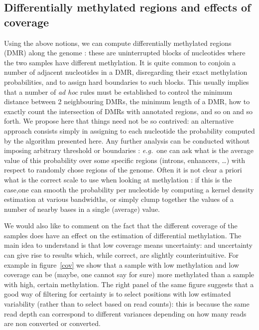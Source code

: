 \documentclass[11pt]{amsart}
\newcommand{\eg}{\textit{e.g.}\ }
\begin{document}
\subsection{Differentially methylated regions and effects of coverage}
Using the above notions, we can compute differentially methylated regions (DMR) along the genome : these are uninterrupted blocks of nucleotides where the two samples have different methylation.
It is quite common to conjoin a number of adjacent nucleotides in a DMR, disregarding their exact methylation probabilities, and to assign hard boundaries to such blocks. This usually implies that a number of \textit{ad hoc} rules must be established to control the minimum distance between 2 neighbouring DMRs, the minimum length of a DMR, how to exactly count the intersection of DMRs with annotated regions, and so on and so forth. We propose here that things need not be so contrived: an alternative approach consists simply in assigning to each nucleotide the probability computed by the algorithm presented here. Any further analysis can be conducted without imposing arbitrary threshold or boundaries : \eg one can ask what is the average value of this probability over some specific regions (introns, enhancers, \dots) with respect to randomly chose regions of the genome. Often it is not clear a priori what is the correct scale to use when looking at methylation : if this is the case,one can smooth the probability per nucleotide by computing a kernel density estimation at various bandwidths, or simply clump together the values of a number of nearby bases in a single (average) value. 

We would also like to comment on the fact that the different coverage of the samples does have an effect on
the estimation of differential methylation. The main idea to understand is that low coverage means uncertainty: and uncertainty can give rise to results which, while correct, are slightly counterintuitive. For example in figure~\ref{cov} we show that a sample with low methylation and low coverage can be (maybe, one cannot say for sure) more methylated than a sample with high, certain methylation. The right panel of the same figure suggests that a good way of filtering for certainty is to select positions with low estimated variability (rather than to select based on read counts): this is because the same read depth can correspond to different variances depending on how many reads are non converted or converted. 
\end{document}
